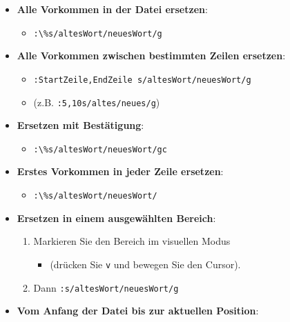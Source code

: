 \documentclass{vorlage-design-main}
\begin{document}
\begin{itemize}

\item
  \textbf{Alle Vorkommen in der Datei ersetzen}:

  \begin{itemize}
  
  \item
    \verb|:\%s/altesWort/neuesWort/g|
  \end{itemize}
\item
  \textbf{Alle Vorkommen zwischen bestimmten Zeilen ersetzen}:

  \begin{itemize}
  
  \item
    \verb|:StartZeile,EndZeile s/altesWort/neuesWort/g|
  \item
    (z.B. \verb|:5,10s/altes/neues/g|)
  \end{itemize}
\item
  \textbf{Ersetzen mit Bestätigung}:

  \begin{itemize}
  
  \item
    \verb|:\%s/altesWort/neuesWort/gc|
  \end{itemize}
\item
  \textbf{Erstes Vorkommen in jeder Zeile ersetzen}:

  \begin{itemize}
  
  \item
    \verb|:\%s/altesWort/neuesWort/|
  \end{itemize}
\item
  \textbf{Ersetzen in einem ausgewählten Bereich}:

  \begin{enumerate}
  \def\labelenumi{\arabic{enumi}.}
  
  \item
    Markieren Sie den Bereich im visuellen Modus

    \begin{itemize}
    
    \item
      (drücken Sie \verb|v| und bewegen Sie den
      Cursor).
    \end{itemize}
  \item
    Dann \verb|:s/altesWort/neuesWort/g|
  \end{enumerate}
\item
  \textbf{Vom Anfang der Datei bis zur aktuellen Position}:


\end{itemize}
\end{document}

